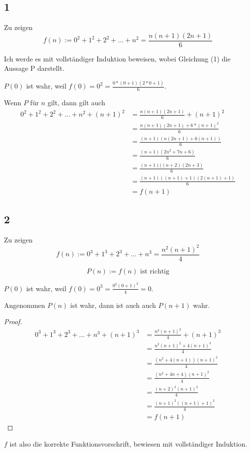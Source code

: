 \documentclass[a4paper,10pt]{article}
\begin{document}
\subsection*{1}

Zu zeigen
\begin{equation}
 f(n) := 0^2 + 1^2 + 2^2 + \dots + n^2 = \frac{n(n + 1)(2n + 1)}{6}
\end{equation}

Ich werde es mit vollständiger Induktion beweisen, wobei Gleichung (1) die Aussage P darstellt.

$P(0)$ ist wahr, weil $f(0) = 0^2 = \frac{0 * (0 + 1)(2 * 0 + 1)}{6}$.

Wenn $P$ für $n$ gilt, dann gilt auch
\begin{align}
 0^2 + 1^2 + 2^2 + \dots + n^2 + (n + 1)^2 & = \frac{n(n + 1)(2n + 1)}{6} + (n + 1)^2\\
 & = \frac{n(n + 1)(2n + 1) + 6 * (n + 1)^2}{6}\\
 & = \frac{(n + 1)(n(2n + 1) + 6(n + 1))}{6}\\
 & = \frac{(n + 1)(2n^2 + 7n + 6)}{6}\\
 & = \frac{(n + 1)((n + 2)(2n + 3)}{6}\\
 & = \frac{(n + 1)((n + 1) + 1)(2(n + 1) + 1)}{6}\\
 & = f(n + 1)
\end{align}

\subsection*{2}

Zu zeigen
\begin{equation}
 f(n) := 0^3 + 1^3 + 2^3 + \dots + n^3 = \frac{n^2(n + 1)^2}{4}
\end{equation}

\begin{equation}
 P(n) := f(n) \text{ ist richtig}
\end{equation}

$P(0)$ ist wahr, weil $f(0) = 0^3 = \frac{0^2(0 + 1)^2}{4} = 0$.

Angenommen $P(n)$ ist wahr, dann ist auch auch $P(n + 1)$ wahr.

\begin{proof}
 \begin{align}
  0^3 + 1^3 + 2^3 + \dots + n^3 + (n + 1)^3 & = \frac{n^2(n + 1)^2}{4} + (n + 1)^3\\
  & = \frac{n^2(n + 1)^2 + 4(n + 1)^3}{4}\\
  & = \frac{(n^2 + 4(n + 1))(n + 1)^2}{4}\\
  & = \frac{(n^2 + 4n + 4)(n + 1)^2}{4}\\
  & = \frac{(n + 2)^2(n + 1)^2}{4}\\
  & = \frac{(n + 1)^2((n + 1) + 1)^2}{4}\\
  & = f(n + 1)
 \end{align}
\end{proof}

$f$ ist also die korrekte Funktionsvorschrift, bewiesen mit vollständiger Induktion.
\end{document}

